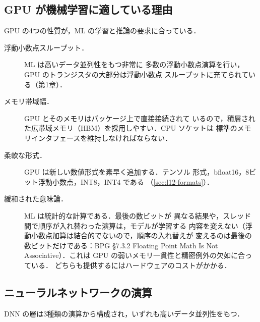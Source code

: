 \documentclass[../main.tex]{subfiles}
\begin{document}
\subsection{GPU が機械学習に適している理由}

GPU の4つの性質が，ML の学習と推論の要求に合っている．
\begin{description}
  \item[浮動小数点スループット．]  ML は高いデータ並列性をもつ非常に
    多数の浮動小数点演算を行い，GPU のトランジスタの大部分は浮動小数点
    スループットに充てられている（第1章）．
  \item[メモリ帯域幅．]  GPU とそのメモリはパッケージ上で直接接続されて
    いるので，積層された広帯域メモリ（HBM）を採用しやすい．CPU ソケットは
    標準のメモリインタフェースを維持しなければならない．
  \item[柔軟な形式．]  GPU は新しい数値形式を素早く追加する．テンソル
    形式，bfloat16，8ビット浮動小数点，INT8，INT4 である
    （\cref{sec:l12-formats}）．
  \item[緩和された意味論．]  ML は統計的な計算である．最後の数ビットが
    異なる結果や，スレッド間で順序が入れ替わった演算は，モデルが学習する
    内容を変えない（浮動小数点加算は結合的でないので，順序の入れ替えが
    変えるのは最後の数ビットだけである：BPG §7.3.2 Floating Point Math Is Not Associative）．これは
    GPU の弱いメモリ一貫性と精密例外の欠如に合っている．
    どちらも提供するにはハードウェアのコストがかかる．
\end{description}

\subsection{ニューラルネットワークの演算}

DNN の層は3種類の演算から構成され，いずれも高いデータ並列性をもつ．
\end{document}
